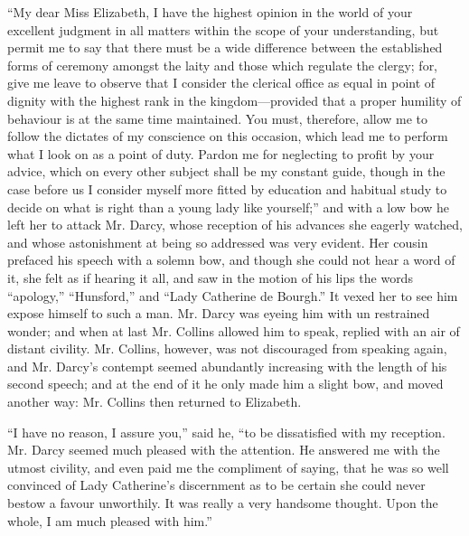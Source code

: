 \documentclass[10pt]{book}
\begin{document}
   “My dear Miss Elizabeth, I have the highest opinion in the world of your
excellent judgment in all matters within the scope of your
understanding, but permit me to say that there must be a wide difference
between the established forms of ceremony amongst the laity and those
which regulate the clergy; for, give me leave to observe that I consider
the clerical office as equal in point of dignity with the highest rank
in the kingdom—provided that a proper humility of behaviour is at the
same time maintained. You must, therefore, allow me to follow the
dictates of my conscience on this occasion, which lead me to perform
what I look on as a point of duty. Pardon me for neglecting to profit by
your advice, which on every other subject shall be my constant guide,
though in the case before us I consider myself more fitted by education
and habitual study to decide on what is right than a young lady like
yourself;” and with a low bow he left her to attack Mr. Darcy, whose
reception of his advances she eagerly watched, and whose astonishment at
being so addressed was very evident. Her cousin prefaced his speech with
a solemn bow, and though she could not hear a word of it, she felt as if
hearing it all, and saw in the motion of his lips the words “apology,”
“Hunsford,” and “Lady Catherine de Bourgh.” It vexed her to see him
expose himself to such a man. Mr. Darcy was eyeing him with
un
   restrained wonder; and when at last Mr. Collins allowed him to speak,
replied with an air of distant civility. Mr. Collins, however, was not
discouraged from speaking again, and Mr. Darcy’s contempt seemed
abundantly increasing with the length of his second speech; and at the
end of it he only made him a slight bow, and moved another way: Mr.
Collins then returned to Elizabeth.
  

   “I have no reason, I assure you,” said he, “to be dissatisfied with my
reception. Mr. Darcy seemed much pleased with the attention. He answered
me with the utmost civility, and even paid me the compliment of saying,
that he was so well convinced of Lady Catherine’s discernment as to be
certain she could never bestow a favour unworthily. It was really a very
handsome thought. Upon the whole, I am much pleased with him.”
  
\end{document}
